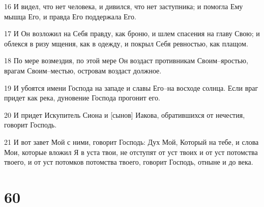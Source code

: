 \par 16 И видел, что нет человека, и дивился, что нет заступника; и помогла Ему мышца Его, и правда Его поддержала Его.
\par 17 И Он возложил на Себя правду, как броню, и шлем спасения на главу Свою; и облекся в ризу мщения, как в одежду, и покрыл Себя ревностью, как плащом.
\par 18 По мере возмездия, по этой мере Он воздаст противникам Своим--яростью, врагам Своим--местью, островам воздаст должное.
\par 19 И убоятся имени Господа на западе и славы Его--на восходе солнца. Если враг придет как река, дуновение Господа прогонит его.
\par 20 И придет Искупитель Сиона и [сынов] Иакова, обратившихся от нечестия, говорит Господь.
\par 21 И вот завет Мой с ними, говорит Господь: Дух Мой, Который на тебе, и слова Мои, которые вложил Я в уста твои, не отступят от уст твоих и от уст потомства твоего, и от уст потомков потомства твоего, говорит Господь, отныне и до века.

\chapter{60}

